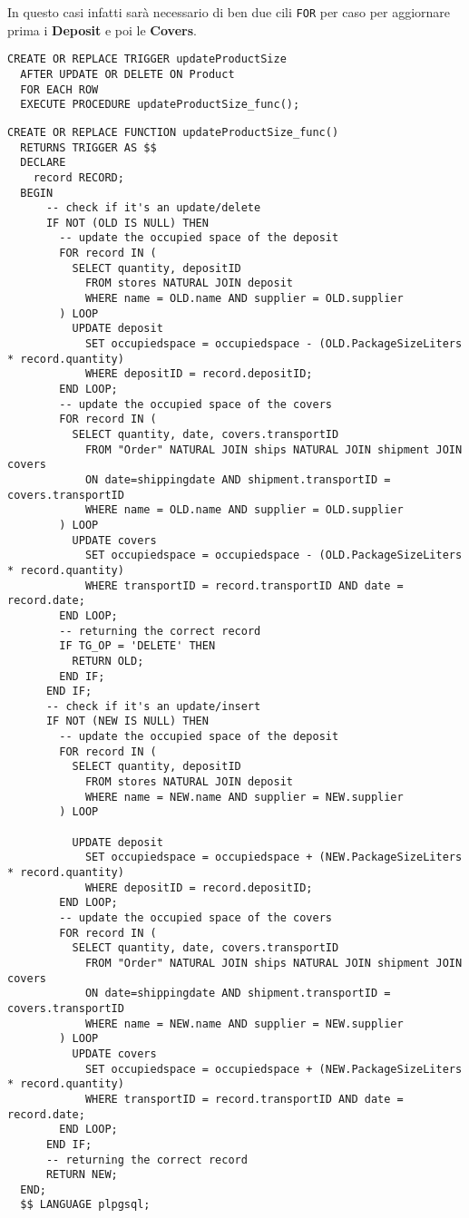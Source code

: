 In questo casi infatti sarà necessario di ben due cili \lstinline{FOR} per caso per aggiornare prima i \textbf{Deposit} e poi le \textbf{Covers}.

\begin{lstlisting}[caption={Trigger per implementare \textbf{updateProductSize}}]
  CREATE OR REPLACE TRIGGER updateProductSize
  AFTER UPDATE OR DELETE ON Product
  FOR EACH ROW
  EXECUTE PROCEDURE updateProductSize_func();
\end{lstlisting}

\begin{lstlisting}[caption={Funzione \textbf{updateProductSize}}]
  CREATE OR REPLACE FUNCTION updateProductSize_func()
  RETURNS TRIGGER AS $$
  DECLARE
    record RECORD;
  BEGIN
      -- check if it's an update/delete
      IF NOT (OLD IS NULL) THEN
        -- update the occupied space of the deposit
        FOR record IN (
          SELECT quantity, depositID
            FROM stores NATURAL JOIN deposit
            WHERE name = OLD.name AND supplier = OLD.supplier
        ) LOOP
          UPDATE deposit
            SET occupiedspace = occupiedspace - (OLD.PackageSizeLiters * record.quantity)
            WHERE depositID = record.depositID;
        END LOOP;
        -- update the occupied space of the covers
        FOR record IN (
          SELECT quantity, date, covers.transportID
            FROM "Order" NATURAL JOIN ships NATURAL JOIN shipment JOIN covers
            ON date=shippingdate AND shipment.transportID = covers.transportID
            WHERE name = OLD.name AND supplier = OLD.supplier
        ) LOOP
          UPDATE covers
            SET occupiedspace = occupiedspace - (OLD.PackageSizeLiters * record.quantity)
            WHERE transportID = record.transportID AND date = record.date;
        END LOOP;
        -- returning the correct record
        IF TG_OP = 'DELETE' THEN
          RETURN OLD;
        END IF;
      END IF;
      -- check if it's an update/insert
      IF NOT (NEW IS NULL) THEN
        -- update the occupied space of the deposit
        FOR record IN (
          SELECT quantity, depositID
            FROM stores NATURAL JOIN deposit
            WHERE name = NEW.name AND supplier = NEW.supplier
        ) LOOP
    
          UPDATE deposit
            SET occupiedspace = occupiedspace + (NEW.PackageSizeLiters * record.quantity)
            WHERE depositID = record.depositID;
        END LOOP;
        -- update the occupied space of the covers
        FOR record IN (
          SELECT quantity, date, covers.transportID
            FROM "Order" NATURAL JOIN ships NATURAL JOIN shipment JOIN covers
            ON date=shippingdate AND shipment.transportID = covers.transportID
            WHERE name = NEW.name AND supplier = NEW.supplier
        ) LOOP
          UPDATE covers
            SET occupiedspace = occupiedspace + (NEW.PackageSizeLiters * record.quantity)
            WHERE transportID = record.transportID AND date = record.date;
        END LOOP;
      END IF;
      -- returning the correct record
      RETURN NEW;
  END;
  $$ LANGUAGE plpgsql;
\end{lstlisting}


